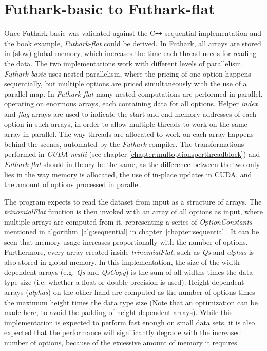 \section{Futhark-basic to Futhark-flat}
Once Futhark-basic was validated against the C\texttt{++} sequential implementation and the book example, \textit{Futhark-flat} could be derived. In Futhark, all arrays are stored in (slow) global memory, which increases the time each thread needs for reading the data. The two implementations work with different levels of parallelism. \textit{Futhark-basic} uses nested parallelism, where the pricing of one option happens sequentially, but multiple options are priced simultaneously with the use of a parallel map. In \textit{Futhark-flat} many nested computations are performed in parallel, operating on enormous arrays, each containing data for all options. Helper \textit{index} and \textit{flag} arrays are used to indicate the start and end memory addresses of each option in such arrays, in order to allow multiple threads to work on the same array in parallel. The way threads are allocated to work on each array happens behind the scenes, automated by the \textit{Futhark} compiler. The transformations performed in \textit{CUDA-multi} (see chapter \ref{chapter:multoptionsperthreadblock}) and \textit{Futhark-flat} should in theory be the same, as the difference between the two only lies in the way memory is allocated, the use of in-place updates in CUDA, and the amount of options processed in parallel.

The program expects to read the dataset from input as a structure of arrays. The \textit{trinomialFlat} function is then invoked with an array of all options as input, where multiple arrays are computed from it, representing a series of \textit{OptionConstants} mentioned in algorithm~\ref{alg:sequential} in chapter~\ref{chapter:sequential}. It can be seen that memory usage increases proportionally with the number of options. Furthermore, every array created inside \textit{trinomialFlat}, such as \textit{Qs} and \textit{alphas} is also stored in global memory. In this implementation, the size of the width-dependent arrays (e.g. \textit{Qs} and \textit{QsCopy}) is the sum of all widths times the data type size (i.e. whether a float or double precision is used). Height-dependent arrays (\textit{alphas}) on the other hand are computed as the number of options times the maximum height times the data type size (Note that an optimization can be made here, to avoid the padding of height-dependent arrays). While this implementation is expected to perform fast enough on small data sets, it is also expected that the performance will significantly degrade with the increased number of options, because of the excessive amount of memory it requires. 

